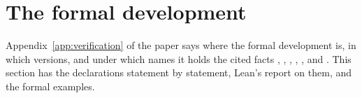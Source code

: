 \section{The formal development}\label{supp:verification}

Appendix~\ref{app:verification} of the paper says where the formal development is, in which
versions, and under which names it holds the cited facts , , ,
, ,  and . This section has the declarations
statement by statement, Lean's report on them, and the formal examples.

